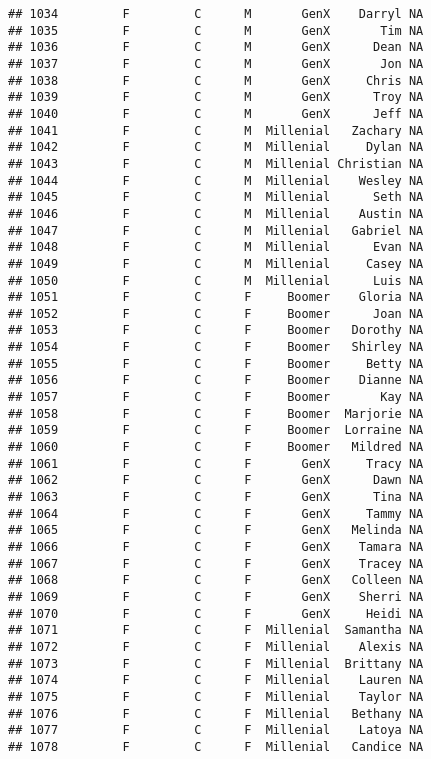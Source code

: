\documentclass[
]{article}
\begin{document}
\begin{verbatim}
## 1034         F         C      M       GenX    Darryl NA
## 1035         F         C      M       GenX       Tim NA
## 1036         F         C      M       GenX      Dean NA
## 1037         F         C      M       GenX       Jon NA
## 1038         F         C      M       GenX     Chris NA
## 1039         F         C      M       GenX      Troy NA
## 1040         F         C      M       GenX      Jeff NA
## 1041         F         C      M  Millenial   Zachary NA
## 1042         F         C      M  Millenial     Dylan NA
## 1043         F         C      M  Millenial Christian NA
## 1044         F         C      M  Millenial    Wesley NA
## 1045         F         C      M  Millenial      Seth NA
## 1046         F         C      M  Millenial    Austin NA
## 1047         F         C      M  Millenial   Gabriel NA
## 1048         F         C      M  Millenial      Evan NA
## 1049         F         C      M  Millenial     Casey NA
## 1050         F         C      M  Millenial      Luis NA
## 1051         F         C      F     Boomer    Gloria NA
## 1052         F         C      F     Boomer      Joan NA
## 1053         F         C      F     Boomer   Dorothy NA
## 1054         F         C      F     Boomer   Shirley NA
## 1055         F         C      F     Boomer     Betty NA
## 1056         F         C      F     Boomer    Dianne NA
## 1057         F         C      F     Boomer       Kay NA
## 1058         F         C      F     Boomer  Marjorie NA
## 1059         F         C      F     Boomer  Lorraine NA
## 1060         F         C      F     Boomer   Mildred NA
## 1061         F         C      F       GenX     Tracy NA
## 1062         F         C      F       GenX      Dawn NA
## 1063         F         C      F       GenX      Tina NA
## 1064         F         C      F       GenX     Tammy NA
## 1065         F         C      F       GenX   Melinda NA
## 1066         F         C      F       GenX    Tamara NA
## 1067         F         C      F       GenX    Tracey NA
## 1068         F         C      F       GenX   Colleen NA
## 1069         F         C      F       GenX    Sherri NA
## 1070         F         C      F       GenX     Heidi NA
## 1071         F         C      F  Millenial  Samantha NA
## 1072         F         C      F  Millenial    Alexis NA
## 1073         F         C      F  Millenial  Brittany NA
## 1074         F         C      F  Millenial    Lauren NA
## 1075         F         C      F  Millenial    Taylor NA
## 1076         F         C      F  Millenial   Bethany NA
## 1077         F         C      F  Millenial    Latoya NA
## 1078         F         C      F  Millenial   Candice NA

\end{verbatim}
\end{document}
